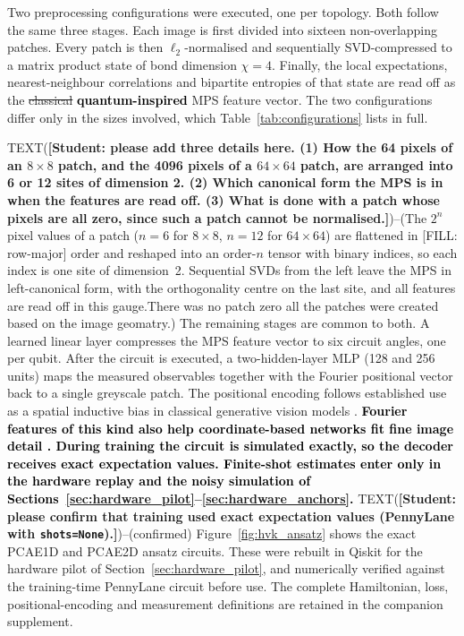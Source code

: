 \documentclass[pdflatex,sn-basic]{sn-jnl}
\newcommand{\del}[1]{\sout{#1}}
\newcommand{\add}[1]{\textbf{\textcolor{black}{#1}}}
\begin{document}
Two preprocessing configurations were executed, one per topology. Both follow the
same three stages. Each image is first divided into sixteen non-overlapping
patches. Every patch is then $\ell_2$-normalised and sequentially SVD-compressed
to a matrix product state of bond dimension $\chi=4$. Finally, the local
expectations, nearest-neighbour correlations and bipartite entropies of that
state are read off as the \del{classical} \add{quantum-inspired} MPS feature vector. The two configurations
differ only in the sizes involved, which Table~\ref{tab:configurations} lists in
full.

TEXT({\color{red}\textbf{[Student: please add three details here. (1) How the 64
pixels of an $8\times8$ patch, and the 4096 pixels of a $64\times64$ patch, are
arranged into 6 or 12 sites of dimension 2. (2) Which canonical form the MPS is
in when the features are read off. (3) What is done with a patch whose pixels
are all zero, since such a patch cannot be normalised.]}})--(The $2^{n}$ pixel values of a patch ($n=6$ for $8\times8$, $n=12$ for
$64\times64$) are flattened in [FILL: row-major] order and reshaped into an
order-$n$ tensor with binary indices, so each index is one site of dimension~2.
Sequential SVDs from the left leave the MPS in left-canonical form, with the
orthogonality centre on the last site, and all features are read off in this
gauge.There was no patch zero  all the patches were created based on the image geomatry.)
\color{green}
The remaining stages are common to both. A learned linear layer compresses the MPS feature vector to six circuit angles, one per qubit. After the circuit is executed, a two-hidden-layer MLP (128 and 256 units) maps the measured observables together with the Fourier positional vector back to a single greyscale patch. The positional encoding follows established use as a spatial inductive bias in classical generative vision models \citep{Xu2021}. \add{Fourier features of
this kind also help coordinate-based networks fit fine image detail
\citep{Tancik2020}. During training the circuit is simulated exactly, so the
decoder receives exact expectation values. Finite-shot estimates enter only in
the hardware replay and the noisy simulation of
Sections~\ref{sec:hardware_pilot}--\ref{sec:hardware_anchors}.}
TEXT({\color{red}\textbf{[Student: please confirm that training used exact
expectation values (PennyLane with \texttt{shots=None}).]}})--(confirmed)
Figure~\ref{fig:hvk_ansatz} shows the exact PCAE1D and PCAE2D ansatz circuits. These were rebuilt in Qiskit for the hardware pilot of
Section~\ref{sec:hardware_pilot}, and numerically verified against the training-time PennyLane circuit before use. The complete Hamiltonian, loss,
positional-encoding and measurement definitions are retained in the companion supplement.
\color{blue}
\end{document}

